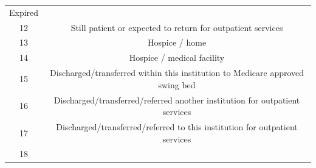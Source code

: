 \documentclass[]{article}
\begin{document}
\begin{itemize}
\begin{longtable}[c]{@{}cc@{}}
\begin{minipage}[t]{0.41\columnwidth}
  Expired
  \strut\end{minipage}\tabularnewline
  \begin{minipage}[t]{0.35\columnwidth}\centering\strut
  12
  \strut\end{minipage} &
  \begin{minipage}[t]{0.41\columnwidth}\centering\strut
  Still patient or expected to return for outpatient services
  \strut\end{minipage}\tabularnewline
  \begin{minipage}[t]{0.35\columnwidth}\centering\strut
  13
  \strut\end{minipage} &
  \begin{minipage}[t]{0.41\columnwidth}\centering\strut
  Hospice / home
  \strut\end{minipage}\tabularnewline
  \begin{minipage}[t]{0.35\columnwidth}\centering\strut
  14
  \strut\end{minipage} &
  \begin{minipage}[t]{0.41\columnwidth}\centering\strut
  Hospice / medical facility
  \strut\end{minipage}\tabularnewline
  \begin{minipage}[t]{0.35\columnwidth}\centering\strut
  15
  \strut\end{minipage} &
  \begin{minipage}[t]{0.41\columnwidth}\centering\strut
  Discharged/transferred within this institution to Medicare approved
  swing bed
  \strut\end{minipage}\tabularnewline
  \begin{minipage}[t]{0.35\columnwidth}\centering\strut
  16
  \strut\end{minipage} &
  \begin{minipage}[t]{0.41\columnwidth}\centering\strut
  Discharged/transferred/referred another institution for outpatient
  services
  \strut\end{minipage}\tabularnewline
  \begin{minipage}[t]{0.35\columnwidth}\centering\strut
  17
  \strut\end{minipage} &
  \begin{minipage}[t]{0.41\columnwidth}\centering\strut
  Discharged/transferred/referred to this institution for outpatient
  services
  \strut\end{minipage}\tabularnewline
  \begin{minipage}[t]{0.35\columnwidth}\centering\strut
  18
  \strut\end{minipage} &

\end{longtable}
\end{itemize}
\end{document}
